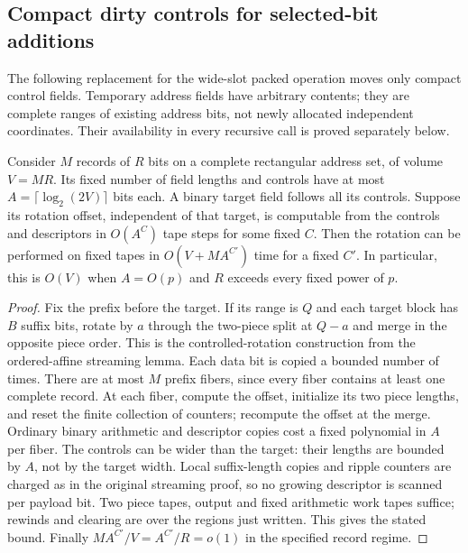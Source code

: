 \subsection{Compact dirty controls for selected-bit additions}
\label{sec:compact-control-movement}
The following replacement for the wide-slot packed operation moves only
compact control fields. Temporary address fields have arbitrary contents;
they are complete ranges of existing address bits, not newly allocated
independent coordinates. Their availability in every recursive call is
proved separately below.

\begin{lemma}
\label{lem:record-paid-rotation}
Consider $M$ records of $R$ bits on a complete rectangular address set, of
volume $V=MR$. Its fixed number of field lengths and controls have at most
$A=\lceil\log_2(2V)\rceil$ bits each. A binary target field follows all its
controls. Suppose its rotation offset, independent of that target, is
computable from the controls and descriptors in $O(A^C)$ tape steps for
some fixed $C$. Then the rotation can be performed on fixed tapes in
$O(V+MA^{C'})$ time for a fixed $C'$. In particular, this is $O(V)$ when
$A=O(p)$ and $R$ exceeds every fixed power of $p$.
\end{lemma}
\begin{proof}
Fix the prefix before the target. If its range is $Q$ and each target block
has $B$ suffix bits, rotate by $a$ through the two-piece split at $Q-a$ and
merge in the opposite piece order. This is the controlled-rotation
construction from the ordered-affine streaming lemma. Each data bit is
copied a bounded number of times. There are at most $M$ prefix fibers, since
every fiber contains at least one complete record. At each fiber, compute
the offset, initialize its two piece lengths, and reset the finite collection
of counters; recompute the offset at the merge. Ordinary binary arithmetic
and descriptor copies cost a fixed polynomial in $A$ per fiber. The controls
can be wider than the target: their lengths are bounded by $A$, not by the
target width. Local suffix-length copies and ripple counters are charged as
in the original streaming proof, so no growing descriptor is scanned per
payload bit. Two piece tapes, output and fixed arithmetic work tapes suffice;
rewinds and clearing are over the regions just written. This gives the stated
bound. Finally $MA^{C'}/V=A^{C'}/R=o(1)$ in the specified record regime.
\end{proof}

